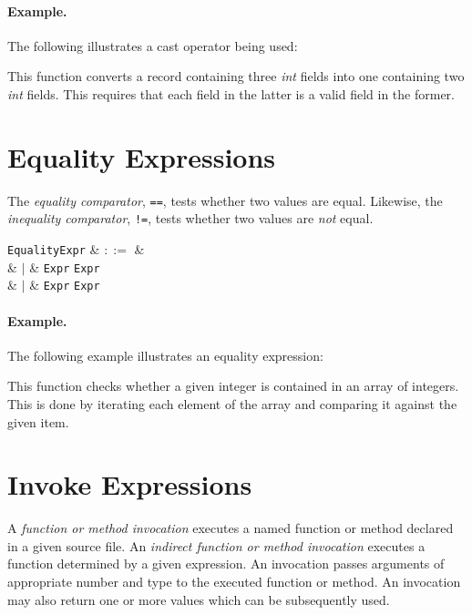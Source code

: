 \paragraph{Example.}  The following illustrates a cast operator being used:



This function converts a record containing three {\em int} fields into one containing two {\em int} fields.  This requires that each field in the latter is a valid field in the former.


\section{Equality Expressions}
\label{c_expr_equality}
The {\em equality comparator}, \lstinline{==}, tests whether two values are equal.  Likewise, the {\em inequality comparator}, \lstinline{!=}, tests whether two values are {\em not} equal.

\begin{syntax}
  \verb+EqualityExpr+ & $::=$ &\\
  & $|$ & \verb+Expr+ \token{==} \verb+Expr+\\
  & $|$ & \verb+Expr+ \token{!=} \verb+Expr+\\
\end{syntax}

\paragraph{Example.}

The following example illustrates an equality expression:



This function checks whether a given integer is contained in an array of integers.  This is done by iterating each element of the array and comparing it against the given item.


\section{Invoke Expressions}
\label{c_expr_invoke}
A {\em function or method invocation} executes a named function or method declared in a given source file.  An {\em indirect function or method invocation} executes a function determined by a given expression.  An invocation passes arguments of appropriate number and type to the executed function or method.  An invocation may also return one or more values which can be subsequently used.


